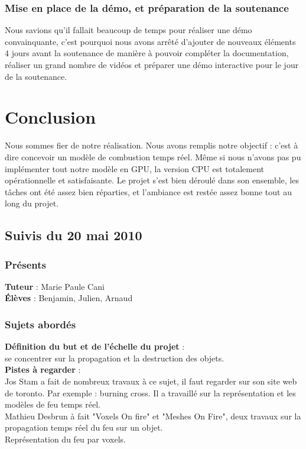 \documentclass[a4paper,10pt]{article}
\begin{document}
\subsubsection{Mise en place de la démo, et préparation de la soutenance}
Nous savions qu'il fallait beaucoup de temps pour réaliser une démo convainquante,
c'est pourquoi nous avons arrêté d'ajouter de nouveaux éléments 4 jours avant la soutenance
de manière à pouvoir compléter la documentation, réaliser un grand nombre de vidéos et préparer 
une démo interactive pour le jour de la soutenance.



\section{Conclusion}
Nous sommes fier de notre réalisation. Nous avons remplis notre objectif : c'est à 
dire concevoir un modèle de combustion temps réel. Même si nous n'avons pas 
pu implémenter tout notre modèle en GPU, la version CPU est totalement
opérationnelle et satisfaisante. Le projet s'est bien déroulé dans son ensemble,
les tâches ont été assez bien réparties, et l'ambiance est restée assez bonne tout au 
long du projet.



\subsection{Suivis du  20 mai 2010}

\subsubsection{Présents}
\textbf{Tuteur} : Marie Paule Cani \\
\textbf{Élèves} : Benjamin, Julien, Arnaud \\

\subsubsection{Sujets abordés}
\textbf{Définition du but et de l'échelle du projet} :  \\
se concentrer sur la propagation et la destruction des objets.\\

\textbf{Pistes à regarder} : \\
Jos Stam a fait de nombreux travaux à ce sujet, il faut regarder sur son site web de toronto. Par exemple : burning cross. Il a travaillé sur la représentation et  les modèles de feu temps réel.\\
Mathieu Desbrun à fait "Voxels On fire" et "Meshes On Fire", deux travaux sur la propagation temps réel du feu sur un objet.\\
Représentation du feu par voxels.\\
\end{document}
